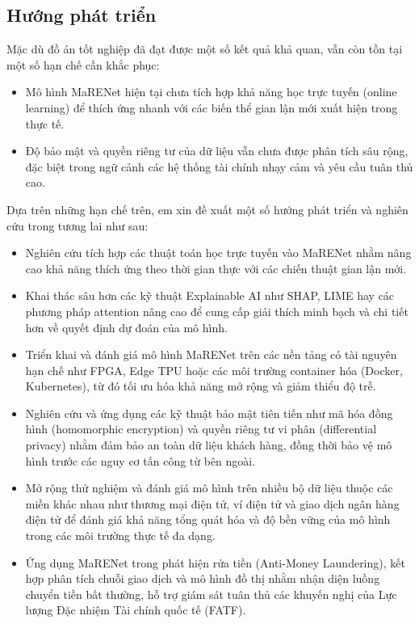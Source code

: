\subsection*{Hướng phát triển}

Mặc dù đồ án tốt nghiệp đã đạt được một số kết quả khả quan, vẫn còn tồn tại một số hạn chế cần khắc phục:
\newpage
\begin{itemize}
    \item  Mô hình MaRENet hiện tại chưa tích hợp khả năng học trực tuyến (online learning) để thích ứng nhanh với các biến thể gian lận mới xuất hiện trong thực tế.
    \item Độ bảo mật và quyền riêng tư của dữ liệu vẫn chưa được phân tích sâu rộng, đặc biệt trong ngữ cảnh các hệ thống tài chính nhạy cảm và yêu cầu tuân thủ cao.
\end{itemize}

Dựa trên những hạn chế trên, em xin đề xuất một số hướng phát triển và nghiên cứu trong tương lai như sau:
\begin{itemize}
    \item Nghiên cứu tích hợp các thuật toán học trực tuyến vào MaRENet nhằm nâng cao khả năng thích ứng theo thời gian thực với các chiến thuật gian lận mới.
    \item Khai thác sâu hơn các kỹ thuật Explainable AI như SHAP, LIME hay các phương pháp attention nâng cao để cung cấp giải thích minh bạch và chi tiết hơn về quyết định dự đoán của mô hình.
    \item Triển khai và đánh giá mô hình MaRENet trên các nền tảng có tài nguyên hạn chế như FPGA, Edge TPU hoặc các môi trường container hóa (Docker, Kubernetes), từ đó tối ưu hóa khả năng mở rộng và giảm thiểu độ trễ.
    \item Nghiên cứu và ứng dụng các kỹ thuật bảo mật tiên tiến như mã hóa đồng hình (homomorphic encryption) và quyền riêng tư vi phân (differential privacy) nhằm đảm bảo an toàn dữ liệu khách hàng, đồng thời bảo vệ mô hình trước các nguy cơ tấn công từ bên ngoài.
    \item Mở rộng thử nghiệm và đánh giá mô hình trên nhiều bộ dữ liệu thuộc các miền khác nhau như thương mại điện tử, ví điện tử và giao dịch ngân hàng điện tử để đánh giá khả năng tổng quát hóa và độ bền vững của mô hình trong các môi trường thực tế đa dạng.
    \item Ứng dụng MaRENet trong phát hiện rửa tiền (Anti-Money Laundering), kết hợp phân tích chuỗi giao dịch và mô hình đồ thị nhằm nhận diện luồng chuyển tiền bất thường, hỗ trợ giám sát tuân thủ các khuyến nghị của Lực lượng Đặc nhiệm Tài chính quốc tế (FATF).

\end{itemize}


